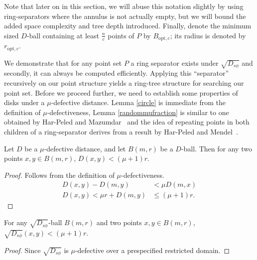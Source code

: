 \documentclass[11pt]{myclass}
\newcommand{\sbreg}{\ensuremath{D_{s\phi}}}
\begin{document}
Note that later on in this section, we will abuse this notation slightly by using ring-separators where the annulus
is not actually empty, but we will bound the added space complexity and tree depth introduced. Finally,  denote the minimum sized $D$-ball containing at least $\frac{n}{c}$ points of $P$ by $B_{\text{opt},c}$; 
its radius is denoted by $r_{\text{opt},c}$. 

We demonstrate that for any point set $P$ a ring separator exists under $\sqrt{\sbreg}$ and secondly, it can always be computed efficiently.  
Applying this ``separator'' recursively on our point structure yields a ring-tree structure for searching our point set.  Before we proceed further, we need to establish some properties of disks under a $\mu$-defective distance.
Lemma \ref{circle} is immediate from the definition of $\mu$-defectiveness, Lemma \ref{randommufraction}
is similar to one obtained by Har-Peled and Mazumdar~\cite{smallestdisk} and the idea of 
repeating points in both children of a ring-separator derives from a result by Har-Peled and 
Mendel~\cite{peledmendel}. 

\begin{lemma} \label{circle}
Let $D$ be a $\mu$-defective distance, and let $B(m,r)$ be a $D$-ball. Then for any two points $x,y \in B(m,r)$, $D(x,y) < (\mu+1) r$.
\end{lemma}
\begin{proof}
 Follows from the definition of  $\mu$-defectiveness.
  \begin{align*}
  D(x,y) - D(m,y) &< \mu  D(m,x) 
  \\ D(x,y) <  \mu r +  D(m,y)  & \leq (\mu + 1) r.
  \end{align*}
 \end{proof}
 
 \begin{corollary}
 For any $\sqrt{\sbreg}$-ball $B(m,r)$ and two points $x,y \in B(m,r)$,
 $\sqrt{\sbreg}(x,y) < (\mu+1) r$. 
 \end{corollary}
\begin{proof}
Since $\sqrt{\sbreg}$ is $\mu$-defective over a prespecified restricted domain.
\end{proof}
\end{document}
